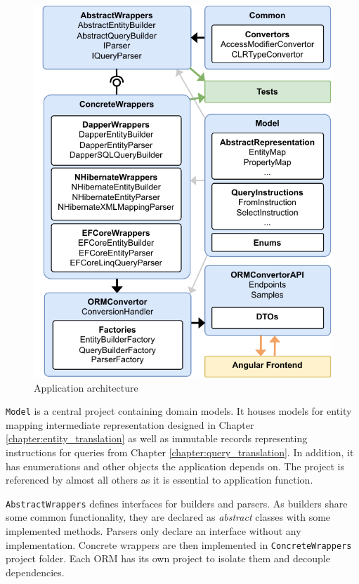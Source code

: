 \begin{figure}[!htp]
  \centering
  \includegraphics[scale=1]{thesis/img/thesis/06_architecture.drawio.pdf}
  \caption{Application architecture}
  \label{fig:app_architecture}
\end{figure}

\texttt{Model} is a central project containing domain models. It houses models for entity mapping intermediate representation designed in Chapter \ref{chapter:entity_translation} as well as immutable records representing instructions for queries from Chapter \ref{chapter:query_translation}. In addition, it has enumerations and other objects the application depends on. The project is referenced by almost all others as it is essential to application function.

\texttt{AbstractWrappers} defines interfaces for builders and parsers. As builders share some common functionality, they are declared as \textit{abstract} classes with some implemented methods. Parsers only declare an interface without any implementation. Concrete wrappers are then implemented in \texttt{ConcreteWrappers} project folder. Each ORM has its own project to isolate them and decouple dependencies.

